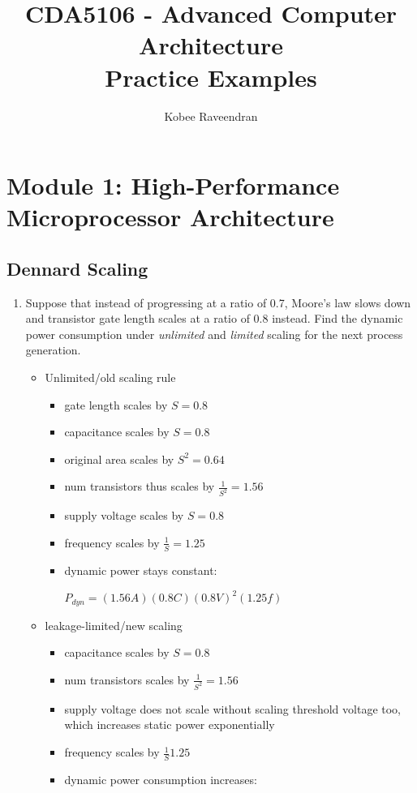 \documentclass[12pt]{article}
\title{CDA5106 - Advanced Computer Architecture \\ Practice Examples}
\author{Kobee Raveendran}
\date{}
\begin{document}
    \maketitle

    \section{Module 1: High-Performance Microprocessor Architecture}

    \subsection{Dennard Scaling}

    \begin{enumerate}
        \item Suppose that instead of progressing at a ratio of 0.7, Moore’s law slows down and transistor gate length scales at a ratio of 0.8 instead. Find the dynamic power consumption under \textit{unlimited} and \textit{limited} scaling for the next process generation.

        \begin{itemize}
            \item Unlimited/old scaling rule
            \begin{itemize}
                \item gate length scales by $S = 0.8$
                \item capacitance scales by $S = 0.8$
                \item original area scales by $S^2 = 0.64$
                \item num transistors thus scales by $\frac{1}{S^2} = 1.56$
                \item supply voltage scales by $S = 0.8$
                \item frequency scales by $\frac{1}{S} = 1.25$
                \item dynamic power stays constant:
            
                $P_{dyn} = (1.56A)(0.8C)(0.8V)^2(1.25f)$
            \end{itemize}
            
            \item leakage-limited/new scaling
            \begin{itemize}
                \item capacitance scales by $S = 0.8$
                \item num transistors scales by $\frac{1}{S^2} = 1.56$
                \item supply voltage does not scale without scaling threshold voltage too, which increases static power exponentially
                \item frequency scales by $\frac{1}{S} 1.25$
                \item dynamic power consumption increases:


\end{itemize}
\end{itemize}
\end{enumerate}
\end{document}
